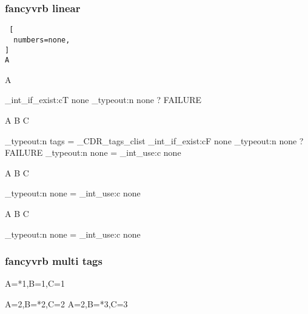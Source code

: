 \subsubsection{\textsf{fancyvrb} linear}

\bgroup


\begin{Verbatim} [
  numbers=none,
]
A
\end{Verbatim}

\begin{CDRBlock} [
  tags=none,
  numbers=none,
]
A
\end{CDRBlock}

\ExplSyntaxOn
\CDR_int_if_exist:cT { none } { \CDR_typeout:n { none ? FAILURE } }
\ExplSyntaxOff

\begin{CDRBlock} [
  tags=none,
  numbers=left,
  firstnumber=last,
]
A
B
C
\end{CDRBlock}
\ExplSyntaxOn
\CDR_typeout:n {tags = \g_CDR_tags_clist }
\CDR_int_if_exist:cF { none } { \CDR_typeout:n { none ? FAILURE } }
\CDR_typeout:n {none = \CDR_int_use:c { none } }
\ExplSyntaxOff

\begin{CDRBlock} [
  tags=none,
  numbers=left,
  firstnumber=last,
]
A
B
C
\end{CDRBlock}
\ExplSyntaxOn
\CDR_typeout:n {none = \CDR_int_use:c { none } }
\ExplSyntaxOff

\begin{CDRBlock} [
  tags=none,
  numbers=left,
  firstnumber=last,
]
A
B
C
\end{CDRBlock}
\ExplSyntaxOn
\CDR_typeout:n {none = \CDR_int_use:c { none }}
\ExplSyntaxOff

\egroup

\subsubsection{\textsf{fancyvrb} multi tags}

\bgroup


\begin{CDRBlock} [
  tags={A,B,C},
  numbers=left,
  firstnumber=last,
]
A=*1,B=1,C=1
\end{CDRBlock}

\begin{CDRBlock} [
  tags={B,C},
  numbers=left,
  firstnumber=last,
]
A=2,B=*2,C=2
A=2,B=*3,C=3
\end{CDRBlock}

